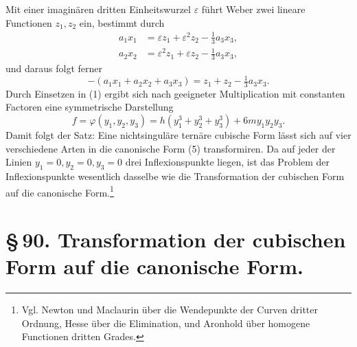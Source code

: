 \documentclass[11pt]{article}
\begin{document}
Mit einer imaginären dritten Einheitswurzel $\varepsilon$ führt Weber zwei lineare Functionen $z_1,z_2$ ein, bestimmt durch
\begin{equation}
\begin{aligned}
 a_1x_1&=\varepsilon z_1+\varepsilon^2z_2-\tfrac13a_3x_3,\\
 a_2x_2&=\varepsilon^2z_1+\varepsilon z_2-\tfrac13a_3x_3,
\end{aligned}
\tag{3}
\end{equation}
und daraus folgt ferner
\begin{equation}
 -(a_1x_1+a_2x_2+a_3x_3)=z_1+z_2-\tfrac13a_3x_3.
 \tag{4}
\end{equation}
Durch Einsetzen in (1) ergibt sich nach geeigneter Multiplication mit constanten Factoren eine symmetrische Darstellung
\begin{equation}
 f=\varphi(y_1,y_2,y_3)=h(y_1^3+y_2^3+y_3^3)+6my_1y_2y_3.
 \tag{5}
\end{equation}
Damit folgt der Satz: Eine nichtsinguläre ternäre cubische Form lässt sich auf vier verschiedene Arten in die canonische Form (5) transformiren. Da auf jeder der Linien $y_1=0,y_2=0,y_3=0$ drei Inflexionspunkte liegen, ist das Problem der Inflexionspunkte wesentlich dasselbe wie die Transformation der cubischen Form auf die canonische Form.\footnote{Vgl. Newton und Maclaurin über die Wendepunkte der Curven dritter Ordnung, Hesse über die Elimination, und Aronhold über homogene Functionen dritten Grades.}

\section*{\S\,90. Transformation der cubischen Form auf die canonische Form.}
\end{document}
